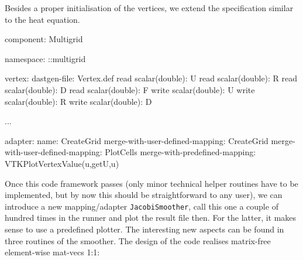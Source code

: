 \noindent
Besides a proper initialisation of the vertices, we extend the specification
similar to the heat equation.
\begin{code}
component: Multigrid

namespace: ::multigrid

vertex:
  dastgen-file: Vertex.def
  read scalar(double): U
  read scalar(double): R
  read scalar(double): D
  read scalar(double): F
  write scalar(double): U
  write scalar(double): R
  write scalar(double): D
  
...

adapter:
  name: CreateGrid
  merge-with-user-defined-mapping: CreateGrid
  merge-with-user-defined-mapping: PlotCells
  merge-with-predefined-mapping: VTKPlotVertexValue(u,getU,u)
\end{code}

\noindent
Once this code framework passes (only minor technical helper routines have to
be implemented, but by now this should be straightforward to any user), we can
introduce a new mapping/adapter \texttt{JacobiSmoother}, call this one a couple of hundred times in the runner and plot the result file then. 
For the latter, it makes sense to use a predefined plotter.
The interesting new aspects can be found in three routines of the smoother.
The design of the code realises matrix-free element-wise mat-vecs 1:1: 


